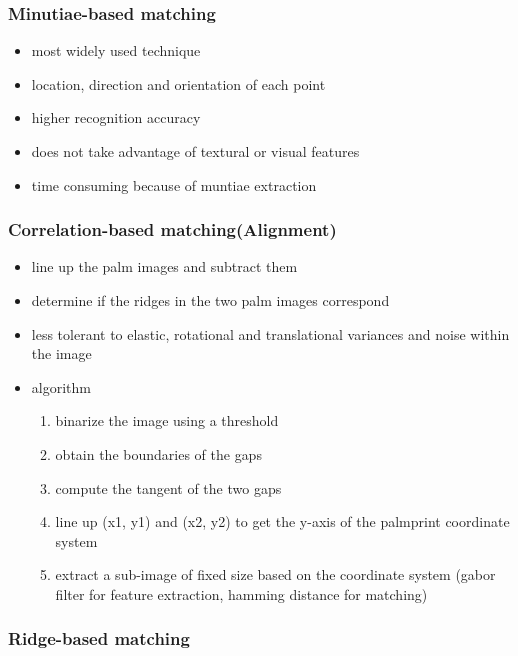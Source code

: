 \documentclass[paper=a4, fontsize=11pt]{scrartcl} %
\numberwithin{equation}{section} %
\numberwithin{figure}{section} %
\numberwithin{table}{section} %
\begin{document}
\subsubsection{Minutiae-based matching}

\begin{itemize}
\item most widely used technique
\item location, direction and orientation of each point
\item higher recognition accuracy
\item does not take advantage of textural or visual features
\item time consuming because of muntiae extraction
\end{itemize}

\subsubsection{Correlation-based matching(Alignment)}

\begin{itemize}
\item line up the palm images and subtract them
\item determine if the ridges in the two palm images correspond
\item less tolerant to elastic, rotational and translational variances and noise within the image
\item algorithm
\begin{enumerate}
\item binarize the image using a threshold
\item obtain the boundaries of the gaps
\item compute the tangent of the two gaps
\item line up (x1, y1) and (x2, y2) to get the y-axis of the palmprint coordinate system
\item extract a sub-image of fixed size based on the coordinate system (gabor filter for feature extraction, hamming distance for matching)
\end{enumerate}
\end{itemize}

\subsubsection{Ridge-based matching}
\end{document}
